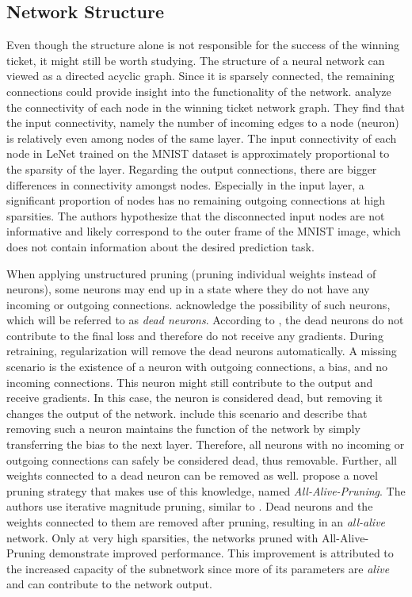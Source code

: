 \subsection{Network Structure}
Even though the structure alone is not responsible for the success of the winning ticket, it might still be worth studying.
The structure of a neural network can viewed as a directed acyclic graph.
Since it is sparsely connected, the remaining connections could provide insight into the functionality of the network.
\textcite{LTH} analyze the connectivity of each node in the winning ticket network graph.
They find that the input connectivity, namely the number of incoming edges to a node (neuron) is relatively even among nodes of the same layer.
The input connectivity of each node in LeNet trained on the MNIST dataset is approximately proportional to the sparsity of the layer.
Regarding the output connections, there are bigger differences in connectivity amongst nodes.
Especially in the input layer, a significant proportion of nodes has no remaining outgoing connections at high sparsities.
The authors hypothesize that the disconnected input nodes are not informative and likely correspond to the outer frame of the MNIST image, which does not contain information about the desired prediction task.

When applying unstructured pruning (pruning individual weights instead of neurons), some neurons may end up in a state where they do not have any incoming or outgoing connections. 
\textcite{HanEtAl15} acknowledge the possibility of such neurons, which will be referred to as \textit{dead neurons}. 
According to \autocite{HanEtAl15}, the dead neurons do not contribute to the final loss and therefore do not receive any gradients. 
During retraining, regularization will remove the dead neurons automatically. 
A missing scenario is the existence of a neuron with outgoing connections, a bias, and no incoming connections. This neuron might still contribute to the output and receive gradients. 
In this case, the neuron is considered dead, but removing it changes the output of the network.
\textcite{AllAlivePruning} include this scenario and describe that removing such a neuron maintains the function of the network by simply transferring the bias to the next layer. 
Therefore, all neurons with no incoming or outgoing connections can safely be considered dead, thus removable. 
Further, all weights connected to a dead neuron can be removed as well.
\textcite{AllAlivePruning} propose a novel pruning strategy that makes use of this knowledge, named \textit{All-Alive-Pruning}. 
The authors use iterative magnitude pruning, similar to \autocite{LTH}.
Dead neurons and the weights connected to them are removed after pruning, resulting in an \textit{all-alive} network.
Only at very high sparsities, the networks pruned with All-Alive-Pruning demonstrate improved performance. 
This improvement is attributed to the increased capacity of the subnetwork since more of its parameters are \textit{alive} and can contribute to the network output.

